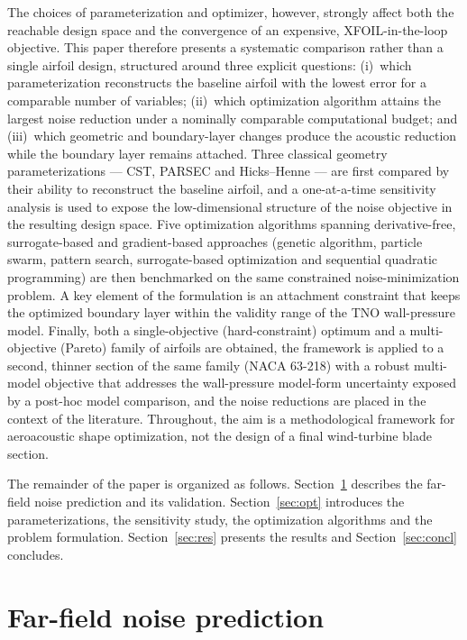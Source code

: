 \documentclass[preprint,3p,times]{elsarticle}
\begin{document}
The choices of parameterization and optimizer, however, strongly affect both
the reachable design space and the convergence of an expensive, XFOIL-in-the-loop
objective. This paper therefore presents a systematic comparison rather than a
single airfoil design, structured around three explicit questions:
(i)~which parameterization reconstructs the baseline airfoil with the lowest
error for a comparable number of variables; (ii)~which optimization algorithm
attains the largest noise reduction under a nominally comparable
computational budget; and
(iii)~which geometric and boundary-layer changes produce the acoustic
reduction while the boundary layer remains attached.
Three classical geometry parameterizations --- CST,
PARSEC and Hicks--Henne --- are first compared by their ability to reconstruct
the baseline airfoil, and a one-at-a-time sensitivity analysis is used to expose
the low-dimensional structure of the noise objective in the resulting design
space. Five optimization algorithms spanning derivative-free, surrogate-based
and gradient-based approaches (genetic algorithm, particle swarm, pattern search,
surrogate-based optimization and sequential quadratic programming) are then
benchmarked on the same constrained noise-minimization problem. A key element of
the formulation is an attachment constraint that keeps the optimized boundary
layer within the validity range of the TNO wall-pressure model. Finally, both a
single-objective (hard-constraint) optimum and a multi-objective (Pareto) family
of airfoils are obtained, the framework is applied to a second, thinner section
of the same family (NACA 63-218) with a robust multi-model objective that
addresses the wall-pressure model-form uncertainty exposed by a post-hoc model
comparison, and the noise reductions are placed
in the context of the literature. Throughout, the aim is a methodological framework for
aeroacoustic shape optimization, not the design of a final wind-turbine blade
section.

The remainder of the paper is organized as follows. Section~\ref{sec:noise}
describes the far-field noise prediction and its validation.
Section~\ref{sec:opt} introduces the parameterizations, the sensitivity study,
the optimization algorithms and the problem formulation. Section~\ref{sec:res}
presents the results and Section~\ref{sec:concl} concludes.

\section{Far-field noise prediction}\label{sec:noise}
\end{document}
